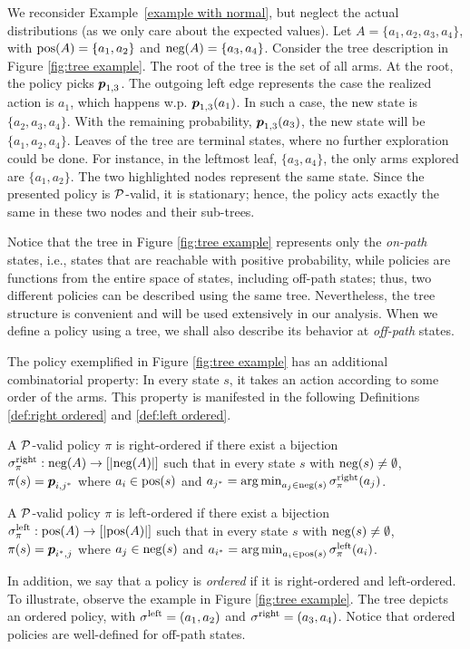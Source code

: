 \begin{example}\label{example with four}
We reconsider Example~\ref{example with normal}, but neglect the actual distributions (as we only care about the expected values). Let $A=\{a_1,a_2,a_3,a_4\}$, with $\textnormal{pos}(A)=\{a_1,a_2\}$ and $\textnormal{neg}(A)=\{a_3,a_4\}$. Consider the tree description in Figure \ref{fig:tree example}. The root of the tree is the set of all arms. At the root, the policy picks $\boldsymbol{ p }_{1,3}$. The outgoing left edge represents the case the realized action is $a_1$, which happens w.p. $\boldsymbol{ p }_{1,3}(a_1)$. In such a case, the new state is $\{a_2,a_3,a_4\}$. With the remaining probability, $\boldsymbol{ p }_{1,3}(a_3)$, the new state will be $\{a_1,a_2,a_4\}$. Leaves of the tree are terminal states, where no further exploration could be done. For instance, in the leftmost leaf, $\{a_3,a_4\}$, the only arms explored are $\{a_1,a_2\}$. The two highlighted nodes represent the same state. Since the presented policy is $\mathcal{P}$-valid, it is stationary; hence, the policy acts exactly the same in these two nodes and their sub-trees.
\end{example}
Notice that the tree in Figure \ref{fig:tree example} represents only the \textit{on-path} states, i.e., states that are reachable with positive probability, while policies are functions from the entire space of states, including off-path states; thus, two different policies can be described using the same tree. Nevertheless, the tree structure is convenient and will be used extensively in our analysis. When we define a policy using a tree, we shall also describe its behavior at \textit{off-path} states.


The policy exemplified in Figure \ref{fig:tree example} has an additional combinatorial property: In every state $s$, it takes an action according to some order of the arms. This property is manifested in the following Definitions \ref{def:right ordered} and \ref{def:left ordered}.
\begin{definition}\label{def:right ordered}
A $\mathcal{P}$-valid policy $\pi$ is right-ordered if there exist a bijection $\sigma^{\textnormal{right}}_\pi: \textnormal{neg}(A)\rightarrow [\left| \textnormal{neg}(A) \right|]$ such that in every state $s$ with $\textnormal{neg}(s) \neq \emptyset$, $\pi(s)=\boldsymbol{ p }_{i, {j^*}}$ where $a_i \in \textnormal{pos}(s)$ and $a_{j^*} = \operatorname*{arg\,min}_{a_j \in \textnormal{neg}(s)} \sigma^{\textnormal{right}}_\pi(a_j)$.
\end{definition}
\begin{definition}\label{def:left ordered}
A $\mathcal{P}$-valid policy $\pi$ is left-ordered if there exist a bijection $\sigma^{\textnormal{left}}_\pi: \textnormal{pos}(A)\rightarrow [\left| \textnormal{pos}(A) \right|]$ such that in every state $s$ with $\textnormal{neg}(s) \neq \emptyset$, $\pi(s)=\boldsymbol{ p }_{{i^*}, j}$ where $a_j \in \textnormal{neg}(s)$ and $a_{i^*} = \operatorname*{arg\,min}_{a_i \in \textnormal{pos}(s)} \sigma^{\textnormal{left}}_\pi(a_i)$.
\end{definition}
In addition, we say that a policy is \textit{ordered} if it is right-ordered and left-ordered. To illustrate, observe the example in Figure \ref{fig:tree example}. The tree depicts an ordered policy, with $\sigma^{\textnormal{left}}=(a_1,a_2)$ and $\sigma^{\textnormal{right}}=(a_3,a_4)$. Notice that ordered policies are well-defined for off-path states.

